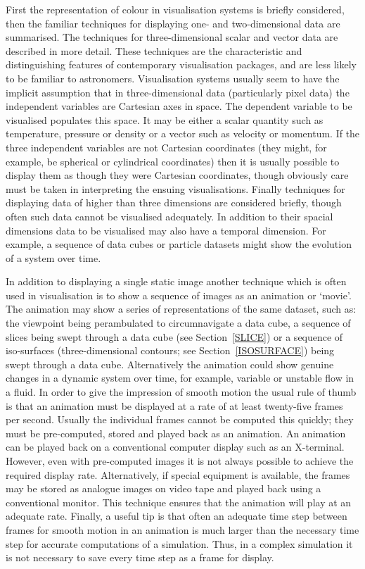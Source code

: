 First the representation of colour in visualisation systems is briefly
considered, then  the familiar techniques for displaying one- and
two-dimensional data are summarised. The techniques for three-dimensional
scalar and vector data are described in more detail. These techniques are
the characteristic and distinguishing features of contemporary
visualisation packages, and are less likely to be familiar to
astronomers. Visualisation systems usually seem to have the implicit
assumption that in three-dimensional data (particularly pixel data)
the independent variables are Cartesian axes in space. The dependent
variable to be visualised populates this space. It may be either a
scalar quantity such as temperature, pressure or density or a vector
such as velocity or momentum. If the three independent variables are
not Cartesian coordinates  (they might, for example, be spherical or
cylindrical coordinates) then it is usually possible to display them as
though they were Cartesian coordinates, though obviously care must be
taken in interpreting the ensuing visualisations. Finally techniques for
displaying data of higher than three dimensions are considered briefly,
though often such data cannot be visualised adequately. In addition to
their spacial dimensions data to be visualised may also have a temporal
dimension. For example, a sequence of data cubes or particle datasets
might show the evolution of a system over time.

In addition to displaying a single static image another technique which
is often used in visualisation is to show a sequence of images as an
animation or `movie'. The animation may show a series of representations
of the same dataset, such as: the viewpoint being perambulated to
circumnavigate a data cube, a sequence of slices being swept through a
data cube (see Section~\ref{SLICE}) or a sequence of iso-surfaces
(three-dimensional contours; see Section~\ref{ISOSURFACE}) being swept
through a data cube. Alternatively the animation could show genuine
changes in a dynamic system over time, for example, variable or unstable
flow in a fluid. In order to give the impression of smooth motion
the usual rule of thumb is that an animation must be displayed
at a rate of at least twenty-five frames per second. Usually the
individual frames cannot be computed this quickly; they must be
pre-computed, stored and played back as an animation. An animation can
be played back on a conventional computer display such as an X-terminal.
However, even with pre-computed images it is not always possible to
achieve the required display rate. Alternatively, if special equipment
is available, the frames may be stored as analogue images on video tape
and played back using a conventional monitor. This technique ensures
that the animation will play at an adequate rate. Finally, a useful tip
is that often an adequate time step between frames for smooth motion in
an animation is much larger than the necessary time step for accurate
computations of a simulation. Thus, in a complex simulation it is not
necessary to save every time step as a frame for display.

